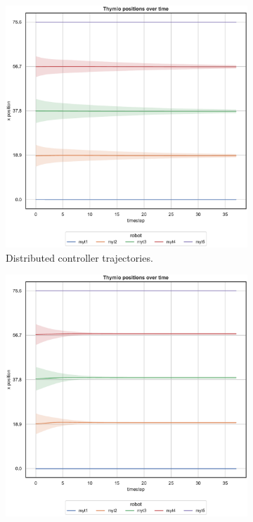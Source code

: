 \begin{figure}[!htb]
\begin{center}
\begin{subfigure}[h]{0.49\textwidth}
			\includegraphics[width=.9\textwidth]{contents/images/net-d1/position-overtime-learned_distributed}
			\caption{Distributed controller trajectories.}
		\end{subfigure}
	\end{center}
	\begin{center}  
		\begin{subfigure}[h]{0.49\textwidth}
			\centering
			\includegraphics[width=.9\textwidth]{contents/images/net-d1/position-overtime-manual}%

\end{subfigure}
\end{center}
\end{figure}
